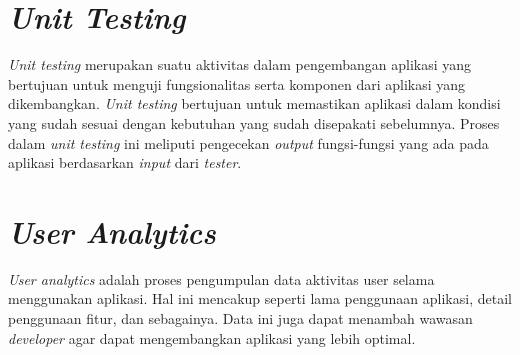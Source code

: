 \section{\textit{Unit Testing}}

\textit{Unit testing} merupakan suatu aktivitas dalam pengembangan aplikasi yang bertujuan untuk menguji fungsionalitas serta komponen dari aplikasi yang dikembangkan. \textit{Unit testing} bertujuan untuk memastikan aplikasi dalam kondisi yang sudah sesuai dengan kebutuhan yang sudah disepakati sebelumnya. Proses dalam \textit{unit testing} ini meliputi pengecekan \textit{output} fungsi-fungsi yang ada pada aplikasi berdasarkan \textit{input} dari \textit{tester}.

\section{\textit{User Analytics}}

\textit{User analytics} adalah proses pengumpulan data aktivitas user selama menggunakan aplikasi. Hal ini mencakup seperti lama penggunaan aplikasi, detail penggunaan fitur, dan sebagainya. Data ini juga dapat menambah wawasan \textit{developer} agar dapat mengembangkan aplikasi yang lebih optimal.